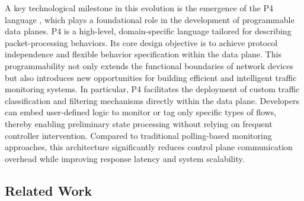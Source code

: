A key technological milestone in this evolution is the emergence of the P4 language \cite{P4.org}, which plays a foundational role in the development of programmable data planes. 
P4 is a high-level, domain-specific language tailored for describing packet-processing behaviors. 
Its core design objective is to achieve protocol independence and flexible behavior specification within the data plane. 
This programmability not only extends the functional boundaries of network devices but also introduces new opportunities for building efficient and intelligent traffic monitoring systems. 
In particular, P4 facilitates the deployment of custom traffic classification and filtering mechanisms directly within the data plane. 
Developers can embed user-defined logic to monitor or tag only specific types of flows, thereby enabling preliminary state processing without relying on frequent controller intervention. 
Compared to traditional polling-based monitoring approaches, this architecture significantly reduces control plane communication overhead while improving response latency and system scalability.

\subsection{Related Work}

